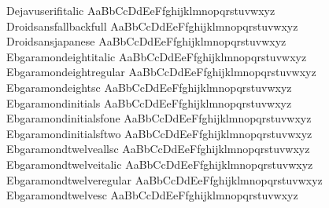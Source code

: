 \begin{tabbing}
Dejavuserifitalic \> { AaBbCcDdEeFfghijklmnopqrstuvwxyz} \\
Droidsansfallbackfull \> { AaBbCcDdEeFfghijklmnopqrstuvwxyz} \\
Droidsansjapanese \> { AaBbCcDdEeFfghijklmnopqrstuvwxyz} \\
Ebgaramondeightitalic \> { AaBbCcDdEeFfghijklmnopqrstuvwxyz} \\
Ebgaramondeightregular \> { AaBbCcDdEeFfghijklmnopqrstuvwxyz} \\
Ebgaramondeightsc \> { AaBbCcDdEeFfghijklmnopqrstuvwxyz} \\
Ebgaramondinitials \> { AaBbCcDdEeFfghijklmnopqrstuvwxyz} \\
Ebgaramondinitialsfone \> { AaBbCcDdEeFfghijklmnopqrstuvwxyz} \\
Ebgaramondinitialsftwo \> { AaBbCcDdEeFfghijklmnopqrstuvwxyz} \\
Ebgaramondtwelveallsc \> { AaBbCcDdEeFfghijklmnopqrstuvwxyz} \\
Ebgaramondtwelveitalic \> { AaBbCcDdEeFfghijklmnopqrstuvwxyz} \\
Ebgaramondtwelveregular \> { AaBbCcDdEeFfghijklmnopqrstuvwxyz} \\
Ebgaramondtwelvesc \> { AaBbCcDdEeFfghijklmnopqrstuvwxyz} \\

\end{tabbing}
